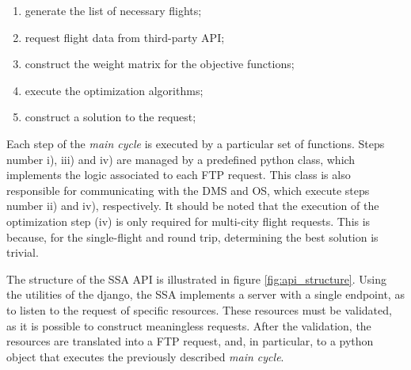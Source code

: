 \begin{enumerate}%
  \item generate the list of necessary flights;
  \item request flight data from third-party API;
  \item construct the weight matrix for the objective functions;
  \item execute the optimization algorithms;
  \item construct a solution to the request;
\end{enumerate}

Each step of the \textit{main cycle} is executed by a particular set of functions. Steps number i), iii) and iv) are managed by a predefined python class, which implements the logic associated to each FTP request. This class is also responsible for communicating with the DMS and OS, which execute steps number ii) and iv), respectively. It should be noted that the execution of the optimization step (iv) is only required for multi-city flight requests. This is because, for the single-flight and round trip, determining the best solution is trivial.



The structure of the SSA API is illustrated in figure \ref{fig:api_structure}. Using the utilities of the django, the SSA implements a server with a single endpoint, as to listen to the request of specific resources. These resources must be validated, as it is possible to construct meaningless requests. After the validation, the resources are translated into a FTP request, and, in particular, to a python object that executes the previously described \textit{main cycle}.



